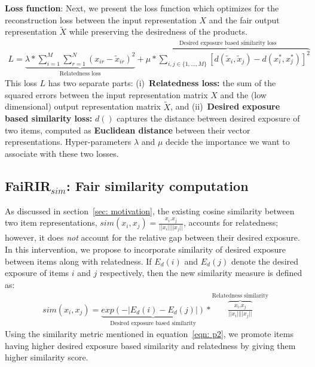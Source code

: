 \vspace{1 mm}
\noindent
\textbf{Loss function}: Next, we present the loss function which optimizes for the reconstruction loss between the input representation $X$ and the fair output representation $\tilde{X}$ while preserving the desiredness of the products.
\scriptsize
\begin{align}
\label{eqn: optimize}
L = \underbrace{\lambda * \sum_{i=1}^{M}\sum_{r=1}^{N} (x_{ir}-\tilde{x}_{ir})^2}_{\textrm{Relatedness loss}} + \overbrace{\mu * \sum_{i, j \in \{1,..., M\}}[d(\tilde{x}_i, \tilde{x}_j)-d(x_i^*, x_j^*)]^2}^{\textrm{Desired exposure based similarity loss}}
\end{align}
\normalsize
This loss $L$ has two separate parts:
(i)~\textbf{Relatedness loss:} the sum of the squared errors between the input representation matrix $X$ and the (low dimensional) output representation matrix $\tilde{X}$, and
(ii)~\textbf{Desired exposure based similarity loss:} 
$d()$ captures the distance between desired exposure of two items, computed as \textbf{Euclidean distance} between their vector representations.
Hyper-parameters $\lambda$ and $\mu$ decide the importance we want to associate with these two losses. %




\subsection{\textbf{FaiRIR$_{sim}$}: Fair similarity computation} \label{sec: Phase 2}

As discussed in section~\ref{sec: motivation}, the existing cosine similarity between two item representations, 
$
sim(x_i, x_j) = \frac{x_i.x_j}{\lvert\lvert x_i \rvert\rvert\lvert\lvert x_j \rvert\rvert}
$,
accounts for relatedness; however, it does {\it not} account for the relative gap between their desired exposure. %
In %
this intervention, we propose to incorporate similarity of desired exposure between items along with relatedness. %
If $E_d(i)$ and $E_d(j)$ denote the desired exposure of items $i$ and $j$ respectively, then the new similarity measure is defined as:
\begin{align}
\label{eqn: p2}
sim(x_i, x_j) = \underbrace{exp(-\lvert E_d(i)-E_d(j)\rvert)}_{\textrm{Desired exposure based similarity}}*\overbrace{\frac{x_i.x_j}{\lvert\lvert x_i \rvert\rvert\lvert\lvert x_j \rvert\rvert}}^{\textrm{Relatedness similarity}}
\end{align}
\normalsize
\noindent %
Using the similarity metric mentioned in equation~\ref{eqn: p2}, we promote items having higher desired exposure based similarity and relatedness
by giving them higher similarity score. %


